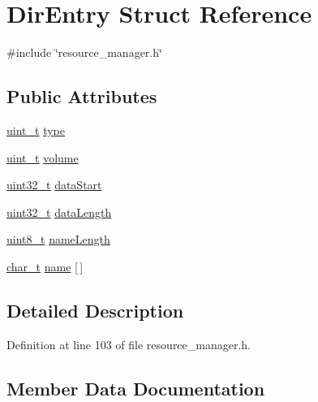 \hypertarget{structDirEntry}{}\section{Dir\+Entry Struct Reference}
\label{structDirEntry}


{\ttfamily \#include \char`\"{}resource\+\_\+manager.\+h\char`\"{}}

\subsection*{Public Attributes}
\begin{DoxyCompactItemize}
\item 
\hyperlink{compiler__port_8h_a12a1e9b3ce141648783a82445d02b58d}{uint\+\_\+t} \hyperlink{structDirEntry_adeb5570e6f7540b047206013d57d4871}{type}
\item 
\hyperlink{compiler__port_8h_a12a1e9b3ce141648783a82445d02b58d}{uint\+\_\+t} \hyperlink{structDirEntry_a3868566fb2e5c61cdbff7c0a07836d27}{volume}
\item 
\hyperlink{stdint_8h_a435d1572bf3f880d55459d9805097f62}{uint32\+\_\+t} \hyperlink{structDirEntry_aedadd10204139bc3a865f544a871f480}{data\+Start}
\item 
\hyperlink{stdint_8h_a435d1572bf3f880d55459d9805097f62}{uint32\+\_\+t} \hyperlink{structDirEntry_ac1360f7a06f37d3a685102f77be55ca6}{data\+Length}
\item 
\hyperlink{stdint_8h_aba7bc1797add20fe3efdf37ced1182c5}{uint8\+\_\+t} \hyperlink{structDirEntry_a98d2a3c2a7b3b52b71682ded82f11333}{name\+Length}
\item 
\hyperlink{compiler__port_8h_a40bb5262bf908c328fbcfbe5d29d0201}{char\+\_\+t} \hyperlink{structDirEntry_abc5f015cc534f080f3f66e02ae2fb453}{name} \mbox{[}$\,$\mbox{]}
\end{DoxyCompactItemize}


\subsection{Detailed Description}


Definition at line 103 of file resource\+\_\+manager.\+h.



\subsection{Member Data Documentation}
\mbox{\label{structDirEntry_ac1360f7a06f37d3a685102f77be55ca6}} 
